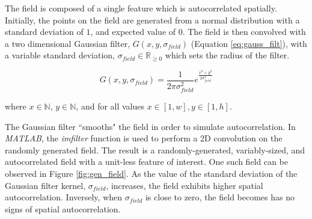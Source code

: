 The field is composed of a single feature which is autocorrelated spatially. Initially, the points on the field are generated from a normal distribution with a standard deviation of $1$, and expected value of $0$. The field is then convolved with a two dimensional Gaussian filter, $G(x,y,\sigma_{field})$ (Equation \ref{eq:gauss_filt}), with a variable standard deviation, $\sigma_{field} \in \mathbb{R}_{\geq 0}$ which sets the radius of the filter. 

\begin{equation}
G(x,y,\sigma_{field}) = \frac{1}{2 \pi \sigma_{field}^2} e^{\frac{x^2 + y^2}{2\sigma_{field}^2}}
\label{eq:gauss_filt}
\end{equation}

\noindent where $x \in \mathbb{N}$, $y \in \mathbb{N}$, and for all values $x \in [1, w], y \in [1, h]$.

The Gaussian filter ``smooths" the field in order to simulate autocorrelation. In \textit{MATLAB}, the \textit{imfilter} function is used to perform a 2D convolution on the randomly generated field. The result is a randomly-generated, variably-sized, and autocorrelated field with a unit-less feature of interest. One such field can be observed in Figure \ref{fig:gen_field}. As the value of the standard deviation of the Gaussian filter kernel, $\sigma_{field}$, increases, the field exhibits higher spatial autocorrelation. Inversely, when $\sigma_{field}$ is close to zero, the field becomes has no signs of spatial autocorrelation.


